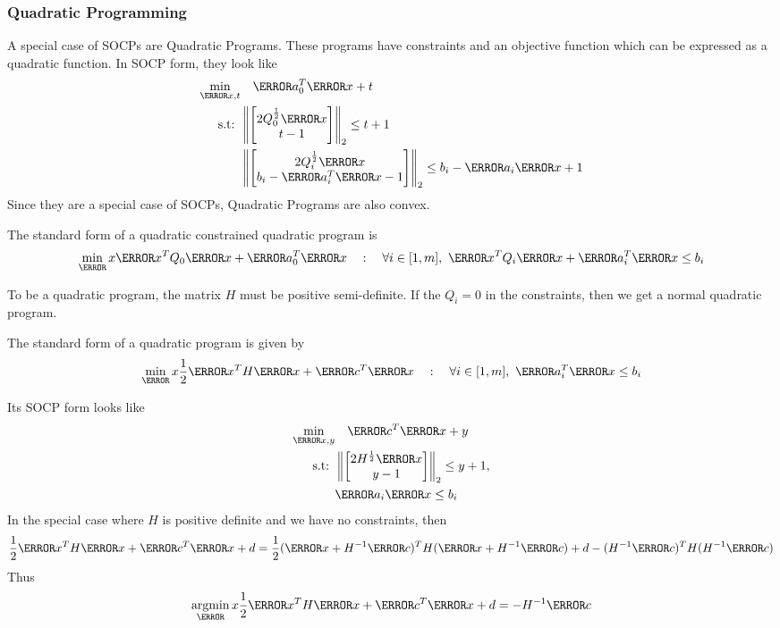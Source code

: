 \subsubsection{Quadratic Programming}
A special case of SOCPs are Quadratic Programs.
These programs have constraints and an objective function which can be expressed as a quadratic function.
In SOCP form, they look like
\begin{align*}
	\min_{\V{x}, t} &\quad \V{a}_0^T\V{x} + t\\
	\text{s.t: } & \left\lVert \begin{bmatrix}2Q_0^{\frac{1}{2}}\V{x}\\ t-1 \end{bmatrix}\right\rVert_2 \leq t+1\\
	& \left\lVert \begin{bmatrix}2Q_i^{\frac{1}{2}}\V{x}\\ b_i-\V{a}_i^T\V{x}-1 \end{bmatrix}\right\rVert_2 \leq b_i - \V{a}_i\V{x} + 1
\end{align*}
Since they are a special case of SOCPs, Quadratic Programs are also convex.
\begin{definition}
	The standard form of a quadratic constrained quadratic program is
	\[
		\min_\V{x} \V{x}^TQ_0\V{x} + \V{a}_0^T\V{x} \quad : \quad \forall i\in[1,m],\ \V{x}^TQ_i\V{x} + \V{a}_i^T\V{x} \leq b_i
	\]
	\label{defn:qcqp}
\end{definition}
To be a quadratic program, the matrix $H$ must be positive semi-definite.
If the $Q_i=0$ in the constraints, then we get a normal quadratic program.
\begin{definition}
	The standard form of a quadratic program is given by \[
		\min_\V{x}\frac{1}{2}\V{x}^TH\V{x} + \V{c}^T\V{x} \quad : \quad \forall i\in[1,m],\ \V{a}_i^T\V{x} \leq b_i
	\]
	\label{defn:quadratic-program}
\end{definition}
Its SOCP form looks like
\begin{align*}
	\min_{\V{x}, y} &\quad \V{c}^T\V{x} + y\\
	\text{s.t: } &\left\lVert \begin{bmatrix}2H^{\frac{1}{2}}\V{x} \\ y - 1 \end{bmatrix}\right\rVert_2 \leq y + 1,\\
	& \V{a}_i\V{x} \leq b_i
\end{align*}
In the special case where $H$ is positive definite and we have no constraints, then
\[
	\frac{1}{2}\V{x}^TH\V{x} + \V{c}^T\V{x} + d = \frac{1}{2}(\V{x} + H^{-1}\V{c})^TH(\V{x} + H^{-1}\V{c}) + d - (H^{-1}\V{c})^TH(H^{-1}\V{c})
\]
Thus \[
	\argmin_\V{x} \frac{1}{2}\V{x}^TH\V{x} + \V{c}^T\V{x} + d = -H^{-1}\V{c}
\]
